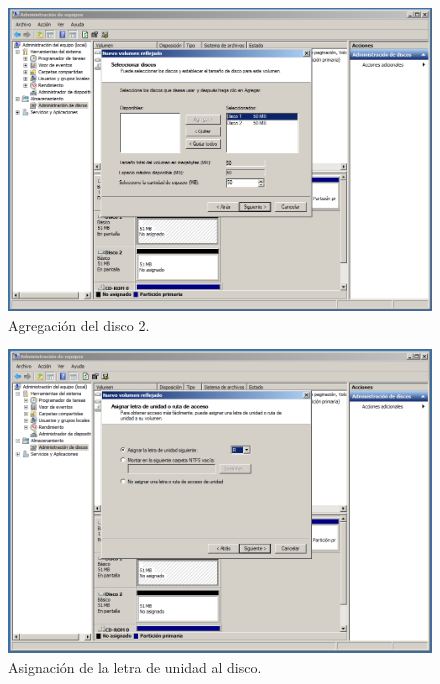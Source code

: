 \documentclass[a4paper,titlepage,12pt]{scrartcl}	%
\numberwithin{figure}{section} %
\numberwithin{table}{section} %
\begin{document}
	\begin{figure}[H]
		\centering
		\includegraphics[scale=0.38]{./Imagenes/WSRAIDPaso3.png}
		\caption[Agregación del disco 2.]{Agregación del disco 2.}
		\label{WSRAIDPaso3}
	\end{figure}
	
	\begin{figure}[H]
		\centering
		\includegraphics[scale=0.38]{./Imagenes/WSRAIDPaso4.png}
		\caption[Asignación de la letra de unidad al disco.]{Asignación de la letra de unidad al disco.}
		\label{WSRAIDPaso4}
	\end{figure}	
	
\end{document}
